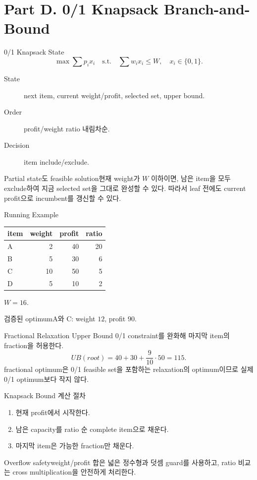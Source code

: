 \section{Part D. 0/1 Knapsack Branch-and-Bound}
\begin{frame}{0/1 Knapsack State}
\[
\max\sum p_ix_i\quad\text{s.t.}\quad \sum w_ix_i\le W,\quad x_i\in\{0,1\}.
\]
\begin{description}
\item[State] next item, current weight/profit, selected set, upper bound.
\item[Order] profit/weight ratio 내림차순.
\item[Decision] item include/exclude.
\end{description}
\begin{block}{Partial state도 feasible solution}현재 weight가 \(W\) 이하이면, 남은 item을 모두 exclude하여 지금 selected set을 그대로 완성할 수 있다. 따라서 leaf 전에도 current profit으로 incumbent를 갱신할 수 있다.\end{block}
\end{frame}
\begin{frame}{Running Example}
\centering\small
\begin{tabular}{lrrr}\toprule item&weight&profit&ratio\\\midrule
A&2&40&20\\B&5&30&6\\C&10&50&5\\D&5&10&2\\\bottomrule
\end{tabular}
\qquad \(W=16\).
\begin{exampleblock}{검증된 optimum}A와 C: weight \(12\), profit \(90\).\end{exampleblock}
\end{frame}
\begin{frame}{Fractional Relaxation Upper Bound}
0/1 constraint를 완화해 마지막 item의 fraction을 허용한다.
\[
UB(root)=40+30+\frac{9}{10}\cdot50=115.
\]
fractional optimum은 0/1 feasible set을 포함하는 relaxation의 optimum이므로 실제 0/1 optimum보다 작지 않다.
\end{frame}
\begin{frame}{Knapsack Bound 계산 절차}
\begin{enumerate}
\item 현재 profit에서 시작한다.
\item 남은 capacity를 ratio 순 complete item으로 채운다.
\item 마지막 item은 가능한 fraction만 채운다.
\end{enumerate}
\begin{alertblock}{Overflow safety}weight/profit 합은 넓은 정수형과 덧셈 guard를 사용하고, ratio 비교는 cross multiplication을 안전하게 처리한다.\end{alertblock}
\end{frame}
